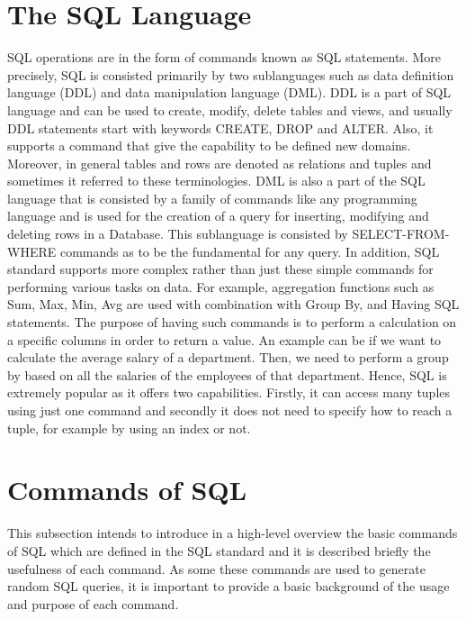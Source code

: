 \section{The SQL Language}
SQL operations are in the form of commands known as SQL statements. More precisely, SQL is consisted primarily by two sublanguages such as data definition language (DDL) and data manipulation language (DML). DDL is a part of SQL language and can be used to create, modify, delete tables and views, and usually DDL statements start with keywords CREATE, DROP and ALTER. Also, it supports a command that give the capability to be defined new domains. Moreover, in general tables and rows are denoted as relations and tuples and sometimes it referred to these terminologies. DML is also a part of the SQL language that is consisted by a family of commands like any programming language and is used for the creation of a query for inserting, modifying and deleting rows in a Database. This sublanguage is consisted by SELECT-FROM-WHERE commands as to be the fundamental for any query. In addition, SQL standard supports more complex rather than just these simple commands for performing various tasks on data. For example, aggregation functions such as Sum, Max, Min, Avg are used with combination with Group By, and Having SQL statements. The purpose of having such commands is to perform a calculation on a specific  columns in order to return a value. An example can be if we want to calculate the average salary of a department. Then, we need to perform a group by based on all the salaries of the employees of that department. 
Hence, SQL is extremely popular as it offers two capabilities. Firstly, it can access many tuples using just one command and secondly it does not need to specify how to reach a tuple, for example by using an index or not. 

\section{Commands of SQL}

This subsection intends to introduce in a high-level overview the basic commands of SQL which are defined in the SQL standard and it is described briefly the usefulness of each command. As some these commands are used to generate random SQL queries, it is important to provide a basic background of the usage and purpose of each command. 

